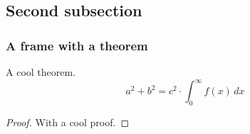 \documentclass{beamer}
\begin{document}
\subsection{Second subsection}
\begin{frame}
  \frametitle{A frame with a theorem}
  \begin{theorem}
    A cool theorem.
    \begin{equation*}
      a^2+b^2=c^2\cdot\int_0^\infty f(x)\,dx
    \end{equation*}
  \end{theorem}  
  \pause
  \begin{proof}
    With a cool proof.
  \end{proof}
\end{frame}
\end{document}
